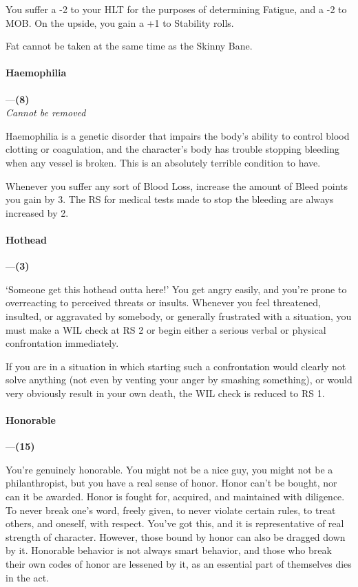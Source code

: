 \documentclass[oneside,11pt,english]{book}
\begin{document}
You suffer a -2 to your HLT for the purposes of determining Fatigue, and a -2 to MOB. 
On the upside, you gain a +1 to Stability rolls. 


Fat cannot be taken at the same time as the Skinny Bane.
\paragraph{\label{bane:Haemophilia}Haemophilia}---\quad\textbf{(8) }\\
\textit{Cannot be removed}\par
Haemophilia is a genetic disorder that impairs the body’s ability to control blood clotting or coagulation, 
and the character’s body has trouble stopping bleeding when any vessel is broken. This is an absolutely 
terrible condition to have. 


Whenever you suffer any sort of Blood Loss, increase the amount of Bleed points you gain by 3. The RS 
for medical tests made to stop the bleeding are always increased by 2. 


\paragraph{\label{bane:Hothead}Hothead}---\quad\textbf{(3) }\par
‘Someone get this hothead outta here!’ You get angry easily, and you're prone to overreacting to 
perceived threats or insults. Whenever you feel threatened, insulted, or aggravated by somebody, or 
generally frustrated with a situation, you must make a WIL check at RS 2 or begin either a serious verbal 
or physical confrontation immediately. 


If you are in a situation in which starting such a confrontation would clearly not solve anything (not even 
by venting your anger by smashing something), or would very obviously result in your own death, the 
WIL check is reduced to RS 1. 


\paragraph{\label{bane:Honorable}Honorable}---\quad\textbf{(15) }\par
You're genuinely honorable. You might not be a nice guy, you might not be a philanthropist, but you have 
a real sense of honor. Honor can't be bought, nor can it be awarded. Honor is fought for, acquired, and 
maintained with diligence. To never break one's word, freely given, to never violate certain rules, to treat 
others, and oneself, with respect. You've got this, and it is representative of real strength of character. 
However, those bound by honor can also be dragged down by it. Honorable behavior is not always smart 
behavior, and those who break their own codes of honor are lessened by it, as an essential part of 
themselves dies in the act. 
\end{document}
